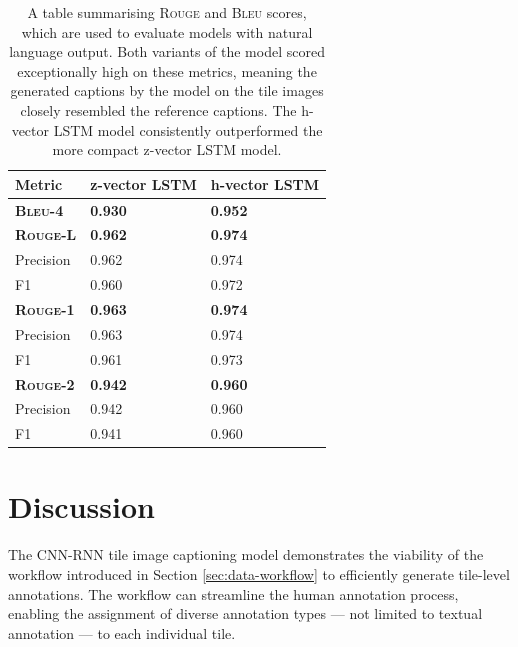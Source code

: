 \documentclass{l4proj}
\begin{document}
\begin{table}[]
\centering
\caption{A table summarising \textsc{Rouge} and \textsc{Bleu} scores, which are used to evaluate models with natural language output. Both variants of the model scored exceptionally high on these metrics, meaning the generated captions by the model on the tile images closely resembled the reference captions. The h-vector LSTM model consistently outperformed the more compact z-vector LSTM model.}
\label{tab:text-metrics}
\begin{tabular}{@{}lll@{}}
\textbf{Metric}           & \textbf{z-vector LSTM} & \textbf{h-vector LSTM} \\ \midrule
\textbf{\textsc{Bleu-4}}  & \textbf{0.930}               & \textbf{0.952}                \\ \rule{0pt}{3ex}
\textbf{\textsc{Rouge-L}} & \textbf{0.962}               & \textbf{0.974}                \\
Precision                 & 0.962                        & 0.974                         \\
F1                        & 0.960                        & 0.972                         \\ \rule{0pt}{3ex}
\textbf{\textsc{Rouge-1}} & \textbf{0.963}               & \textbf{0.974}                \\
Precision                 & 0.963                        & 0.974                         \\
F1                        & 0.961                        & 0.973                         \\ \rule{0pt}{3ex}
\textbf{\textsc{Rouge-2}} & \textbf{0.942}               & \textbf{0.960}                \\
Precision                 & 0.942                        & 0.960                         \\
F1                        & 0.941                        & 0.960                        
\end{tabular}
\end{table}

\section{Discussion} \label{sec:caption-discussion}
The CNN-RNN tile image captioning model demonstrates the viability of the workflow introduced in Section \ref{sec:data-workflow} to efficiently generate tile-level annotations. The workflow can streamline the human annotation process, enabling the assignment of diverse annotation types --- not limited to textual annotation --- to each individual tile.
\end{document}
